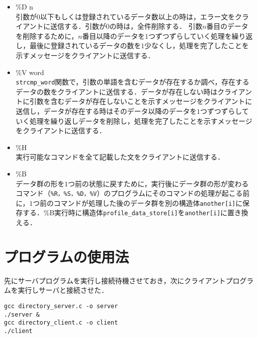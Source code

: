\documentclass{jarticle}[11pt]
\begin{document}
\begin{itemize}
\item \%D n\\
引数が$0$以下もしくは登録されているデータ数以上の時は，エラー文をクライアントに送信する．引数が$0$の時は，全件削除する．
引数$n$番目のデータを削除するために，$n$番目以降のデータを$1$つずつずらしていく処理を繰り返し，最後に登録されているデータの数を$1$少なくし，処理を完了したことを示すメッセージをクライアントに送信する．

\item \%V word\\
\verb|strcmp_word|関数で，引数の単語を含むデータが存在するか調べ，存在するデータの数をクライアントに送信する．データが存在しない時はクライアントに引数を含むデータが存在しないことを示すメッセージをクライアントに送信し，データが存在する時はそのデータ以降のデータを$1$つずつずらしていく処理を繰り返しデータを削除し，処理を完了したことを示すメッセージをクライアントに送信する．

\item \%H \\
実行可能なコマンドを全て記載した文をクライアントに送信する．

\item \%B \\
データ群の形を$1$つ前の状態に戻すために，実行後にデータ群の形が変わるコマンド（\verb|%R，%S，%D，%V|）のプログラムにそのコマンドの処理が起こる前に，$1$つ前のコマンドが処理した後のデータ群を別の構造体\verb|another[i]|に保存する．\%B実行時に構造体\verb|profile_data_store[i]|を\verb|another[i]|に置き換える．
\end{itemize}


    \section{プログラムの使用法}
先にサーバプログラムを実行し接続待機させておき，次にクライアントプログラムを実行しサーバと接続させた．

\begin{verbatim}
gcc directory_server.c -o server
./server &
gcc directory_client.c -o client
./client
\end{verbatim}
\end{document}
